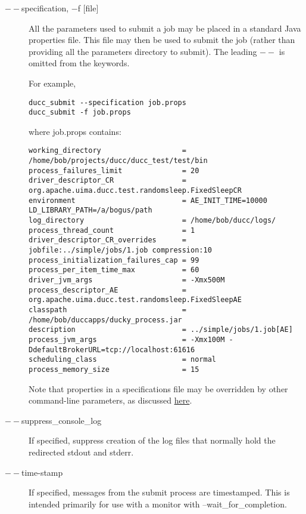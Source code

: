 \begin{description}
           \item[$--$specification, $-$f {[file]}  ]

             All the parameters used to submit a job may be placed in a standard Java properties file. 
             This file may then be used to submit the job (rather than providing all the parameters 
             directory to submit). The leading $--$ is omitted from the keywords.

             For example, 
\begin{verbatim}
ducc_submit --specification job.props 
ducc_submit -f job.props 
\end{verbatim}

             where job.props contains: 
\begin{verbatim}
working_directory                   = /home/bob/projects/ducc/ducc_test/test/bin 
process_failures_limit              = 20 
driver_descriptor_CR                = org.apache.uima.ducc.test.randomsleep.FixedSleepCR 
environment                         = AE_INIT_TIME=10000 LD_LIBRARY_PATH=/a/bogus/path 
log_directory                       = /home/bob/ducc/logs/ 
process_thread_count                = 1 
driver_descriptor_CR_overrides      = jobfile:../simple/jobs/1.job compression:10 
process_initialization_failures_cap = 99 
process_per_item_time_max           = 60 
driver_jvm_args                     = -Xmx500M 
process_descriptor_AE               = org.apache.uima.ducc.test.randomsleep.FixedSleepAE 
classpath                           = /home/bob/duccapps/ducky_process.jar 
description                         = ../simple/jobs/1.job[AE] 
process_jvm_args                    = -Xmx100M -DdefaultBrokerURL=tcp://localhost:61616 
scheduling_class                    = normal 
process_memory_size                 = 15 
\end{verbatim}

             Note that properties in a specifications file may be overridden by other command-line
             parameters, as discussed \hyperref[chap:cli]{here}.

           \item[$--$suppress\_console\_log] If specified, suppress creation of the log files that 
             normally hold the redirected stdout and stderr.

           \item[$--$time-stamp ]

             If specified, messages from the submit process are timestamped. This is intended primarily 
             for use with a monitor with --wait\_for\_completion. 


\end{description}
